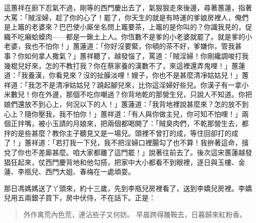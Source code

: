 這蕙祥在廚下忍氣不過，剛等的西門慶出去了，氣狠狠走來後邊，尋著蕙蓮，指著大罵：「賊淫婦，趁了你的心了！罷了，你天生的就是有時運的爹娘房裡人，俺們是上竈的老婆來？巴巴使小廝坐名問上竈要茶，上竈的是你叫的？你識我見的，促織不吃癩蛤蟆肉——都是一鍬土上人。你恆數不是爹的小老婆就罷了。就是爹的小老婆，我也不怕你！」蕙蓮道：「你好沒要緊，你頓的茶不好，爹嫌你，管我甚事？你如何拿人撒氣？」蕙祥聽了，越發惱了，罵道：「賊淫婦！你剛纔調唆打我幾棍兒好來，怎的不教打我？你在蔡家養的漢數不了，來這裡還弄鬼哩！」蕙蓮道：「我養漢，你看見來？沒的扯臊淡哩！嫂子，你也不是甚麼清凈姑姑兒！」蕙祥道：「我怎不是清凈姑姑兒？蹺起腳兒來，比你這淫婦好些兒。你漢子有一拿小米數兒！你在外邊，那個不吃你嘲過？你背地乾的那營生兒，只說人不知道。你把娘們還放不到心上，何況以下的人！」蕙蓮道：「我背地裡說甚麼來？怎的放不到心上？隨你壓我，我不怕你！」蕙祥道：「有人與你做主兒，你可知不怕哩！」兩個正拌嘴，被小玉請的月娘來，把兩個都喝開了：「賊臭肉們，不乾那營生去，都拌的是些甚麼？教你主子聽見又是一場兒。頭裡不曾打的成，等住回卻打的成了！」蕙祥道：「若打我一下兒，我不把淫婦口裡腸勾了也不算！我拚著這命，擯兌了你也不差廝甚麼。咱大家都離了這門罷！」說著往前去了。後次這宋蕙蓮越發猖狂起來，仗西門慶背地和他勾搭，把家中大小都看不到眼裡，逐日與玉樓、金蓮、李瓶兒、西門大姐、春梅在一處頑耍。

那日馮媽媽送了丫頭來，約十三歲，先到李瓶兒房裡看了，送到李嬌兒房裡。李嬌兒用五兩銀子買下，房中伏侍，不在話下。正是：
\begin{quote}
外作禽荒內色荒，連沾些子又何妨。
早晨跨得雕鞍去，日暮歸來紅粉香。
\end{quote}
